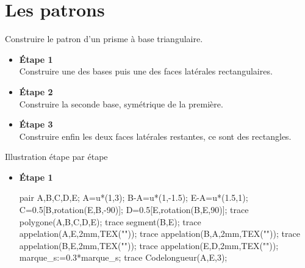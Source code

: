 \section{Les patrons}
\vspace*{-10mm}
    \begin{methode*1}
        \exercice
        Construire le patron d'un prisme à base triangulaire.
        \vspace*{-5mm}
        \begin{multicols}{3}
            \begin{itemize}
                \item \textbf{Étape 1}\\
                Construire une des bases puis une des faces latérales rectangulaires.
                \columnbreak
                \item \textbf{Étape 2}\\
                Construire la seconde base, symétrique de la première.
                \columnbreak
                \item \textbf{Étape 3}\\
                Construire enfin les deux faces latérales restantes, ce sont des rectangles.
            \end{itemize}
        \end{multicols}
        \vspace*{-7mm}
        \correction
        Illustration étape par étape
        \begin{multicols}{3}
            \begin{itemize}
                \item \textbf{Étape 1}\\                
                \begin{Geometrie}
                    pair A,B,C,D,E;
                    A=u*(1,3);
                    B-A=u*(1,-1.5);
                    E-A=u*(1.5,1);
                    C=0.5[B,rotation(E,B,-90)];
                    D=0.5[E,rotation(B,E,90)];
                    trace polygone(A,B,C,D,E);
                    trace segment(B,E);
                    trace appelation(A,E,2mm,TEX("\tiny{}"));
                    trace appelation(B,A,2mm,TEX("\tiny{}"));
                    trace appelation(B,E,2mm,TEX("\tiny{}"));
                    trace appelation(E,D,2mm,TEX("\tiny{}"));
                    marque_s:=0.3*marque_s;
                    trace Codelongueur(A,E,3);

\end{Geometrie}
\end{itemize}
\end{multicols}
\end{methode*1}
